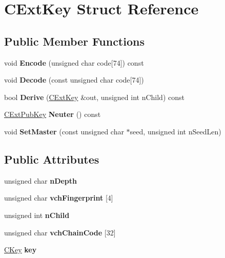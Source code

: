 \hypertarget{struct_c_ext_key}{}\section{C\+Ext\+Key Struct Reference}
\label{struct_c_ext_key}
\subsection*{Public Member Functions}
\begin{DoxyCompactItemize}
\item 
\mbox{\label{struct_c_ext_key_a4f68dfccef42685d954d3fb22fd6c67c}} 
void {\bfseries Encode} (unsigned char code\mbox{[}74\mbox{]}) const
\item 
\mbox{\label{struct_c_ext_key_a9720e119745472336b6729e19f0819dd}} 
void {\bfseries Decode} (const unsigned char code\mbox{[}74\mbox{]})
\item 
\mbox{\label{struct_c_ext_key_a589df63664c6d12bfe071b747a245b1d}} 
bool {\bfseries Derive} (\mbox{\hyperlink{struct_c_ext_key}{C\+Ext\+Key}} \&out, unsigned int n\+Child) const
\item 
\mbox{\label{struct_c_ext_key_a4ea6bbc6c9bda4f8d77cade114155569}} 
\mbox{\hyperlink{struct_c_ext_pub_key}{C\+Ext\+Pub\+Key}} {\bfseries Neuter} () const
\item 
\mbox{\label{struct_c_ext_key_a8cd6ecafdd649082601d7eebbec79688}} 
void {\bfseries Set\+Master} (const unsigned char $\ast$seed, unsigned int n\+Seed\+Len)
\end{DoxyCompactItemize}
\subsection*{Public Attributes}
\begin{DoxyCompactItemize}
\item 
\mbox{\label{struct_c_ext_key_ab197a253f41646975405b4ead8027b55}} 
unsigned char {\bfseries n\+Depth}
\item 
\mbox{\label{struct_c_ext_key_a22efb3f5dfb26cd8d88d2ab5db885978}} 
unsigned char {\bfseries vch\+Fingerprint} \mbox{[}4\mbox{]}
\item 
\mbox{\label{struct_c_ext_key_ad15cb7ab68b59495eec71f6586803048}} 
unsigned int {\bfseries n\+Child}
\item 
\mbox{\label{struct_c_ext_key_a637ce75955e2883d20172b707c26a459}} 
unsigned char {\bfseries vch\+Chain\+Code} \mbox{[}32\mbox{]}
\item 
\mbox{\label{struct_c_ext_key_a93cd93ef3311d9dbcf475282a5f80fb2}} 
\mbox{\hyperlink{class_c_key}{C\+Key}} {\bfseries key}
\end{DoxyCompactItemize}
